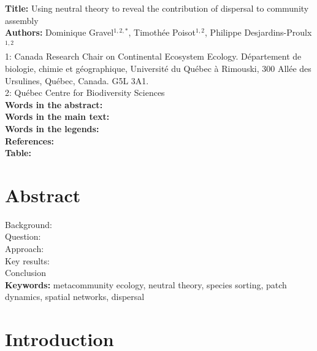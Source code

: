 \documentclass[12pt]{article}
\begin{document}
\linenumbers 
\modulolinenumbers[1]

\textbf{Title:}   Using neutral theory to reveal the contribution of dispersal to community assembly\\

\textbf{Authors:}  Dominique Gravel$^{1,2,*}$, Timoth\'ee Poisot$^{1,2}$, Philippe Desjardins-Proulx$^{1,2}$\\

1: Canada Research Chair on Continental Ecosystem Ecology. D\'epartement de biologie, chimie et g\'eographique, Universit\'e du Qu\'ebec \`a Rimouski, 300 All\'ee des Ursulines, Qu\'ebec, Canada. G5L 3A1.\\

2: Qu\'ebec Centre for Biodiversity Sciences\\

\textbf{Words in the abstract:}      \\
\textbf{Words in the main text:}    \\
\textbf{Words in the legends:}    \\
\textbf{References:}             \\
\textbf{Table:}                    \\

\newpage
\doublespacing


\section*{Abstract}
Background: \\
Question: \\
Approach: \\
Key results: \\
Conclusion\\

\textbf{Keywords:} metacommunity ecology, neutral theory, species
sorting, patch dynamics, spatial networks, dispersal\\

\newpage

\section*{Introduction}
\end{document}
